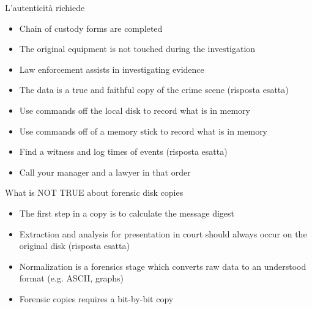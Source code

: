 

L'autenticità richiede
\begin{itemize}
\item Chain of custody forms are completed
\item The original equipment is not touched during the investigation
\item Law enforcement assists in investigating evidence
\item The data is a true and faithful copy of the crime scene (risposta esatta)
\end{itemize}




\begin{itemize}
\item Use commands off the local disk to record what is in memory
\item Use commands off of a memory stick to record what is in memory
\item Find a witness and log times of events (risposta  esatta)
\item Call your manager and a lawyer in that order
\end{itemize}




What is NOT TRUE about forensic disk copies
\begin{itemize}
\item The first step in a copy is to calculate the message digest
\item Extraction and analysis for presentation in court should always occur on
the original disk (risposta esatta)
\item Normalization is a forensics stage which converts raw data to an
understood format (e.g. ASCII, graphs)
\item Forensic copies requires a bit-by-bit copy
\end{itemize}
